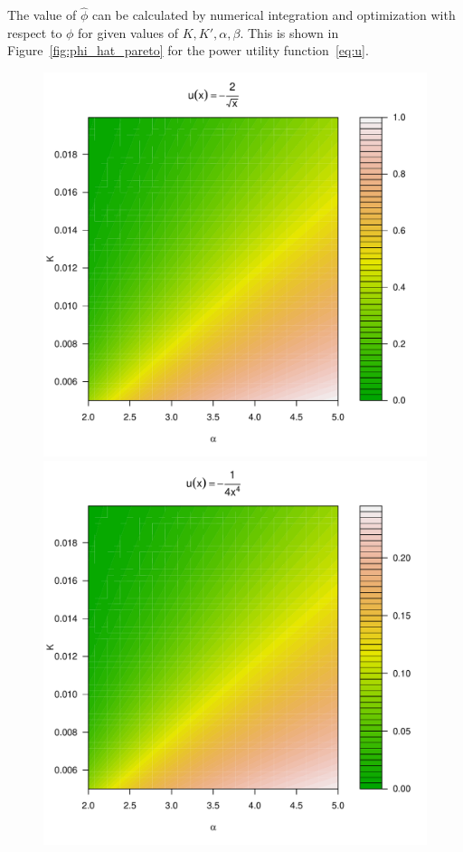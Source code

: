 \documentclass[11pt,a4]{amsart}
\newcommand{\fct}{function}
\newcommand{\1}{{\mathbf 1}}
\begin{document}
\par
The value of $\hat\phi$ can be calculated
by numerical integration and optimization with respect to $\phi$ for
given values of $K, K', \alpha, \beta$.  This is shown in 
Figure~\ref{fig:phi_hat_pareto} for the power utility \fct\ \eqref{eq:u}.
\begin{figure}[htb!]
  \begin{minipage}{0.5\linewidth}
    \includegraphics[width=\textwidth]{phi_hat_pareto5e-1_A.pdf}    
  \end{minipage}\hfill
  \begin{minipage}{0.5\linewidth}
    \includegraphics[width=\textwidth]{phi_hat_pareto4_A.pdf}

\end{minipage}
\end{figure}
\end{document}
